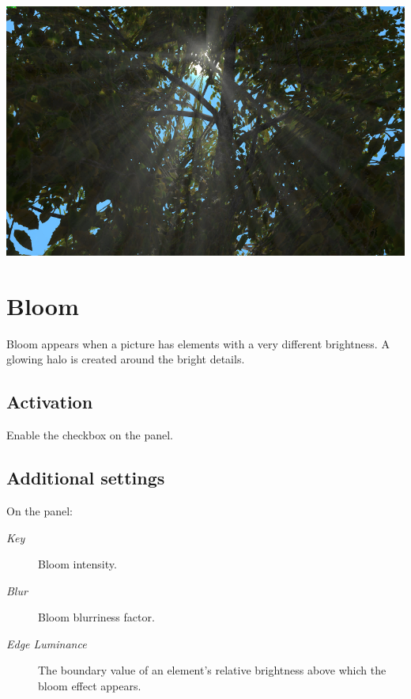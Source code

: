 \documentclass[a4paper,12pt,oneside]{sphinxmanual}
\begin{document}
{\hfill\includegraphics[width=1.000\linewidth]{god_rays.jpg}\hfill}

\begin{DUlineblock}{0em}
\item[] 
\end{DUlineblock}


\section{Bloom}
\label{postprocessing_effects:id14}
Bloom appears when a picture has elements with a very different brightness. A glowing halo is created around the bright details.


\subsection{Activation}
\label{postprocessing_effects:id15}
Enable the  checkbox on the  panel.


\subsection{Additional settings}
\label{postprocessing_effects:id16}
On the  panel:
\begin{description}
\item[{\emph{Key}}] \leavevmode
Bloom intensity.

\item[{\emph{Blur}}] \leavevmode
Bloom blurriness factor.

\item[{\emph{Edge Luminance}}] \leavevmode
The boundary value of an element's relative brightness above which the bloom effect appears.

\end{description}
\end{document}
